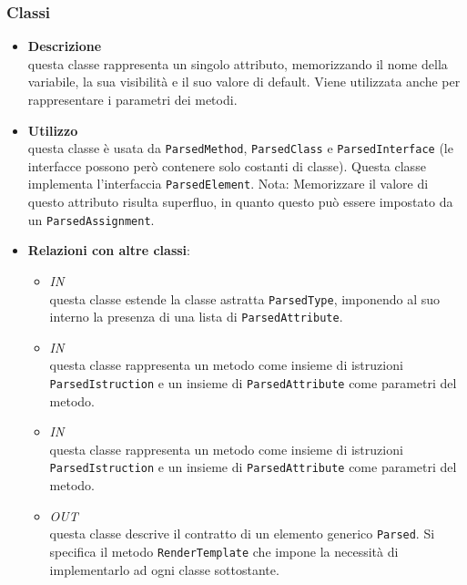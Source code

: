 \subsubsection{Classi}
\label{\nogloxy{swedesigner::server::project::ParsedAttribute}}
\begin{itemize}
\item \textbf{Descrizione}\\
questa classe rappresenta un singolo attributo, memorizzando il nome della variabile, la sua visibilità e il suo valore di default. Viene utilizzata anche per rappresentare i parametri dei metodi.
\item \textbf{Utilizzo}\\
questa classe è usata da \texttt{ParsedMethod},  \texttt{ParsedClass} e \texttt{ParsedInterface} (le interfacce possono però contenere solo costanti di classe).
Questa classe implementa l'interfaccia \texttt{ParsedElement}.
Nota: Memorizzare il valore di questo attributo risulta superfluo, in quanto questo può essere impostato da un \texttt{ParsedAssignment}. 

\item \textbf{Relazioni con altre classi}:
\begin{itemize}
\item \textit{IN} \hyperref[\nogloxy{swedesigner::server::project::ParsedClass}]{}\\
questa classe estende la classe astratta \texttt{ParsedType}, imponendo al suo interno la presenza di una lista di \texttt{ParsedAttribute}. 
\item \textit{IN} \hyperref[\nogloxy{swedesigner::server::project::ParsedMethod}]{}\\
questa classe rappresenta un metodo come insieme di istruzioni \texttt{ParsedIstruction} e un insieme di \texttt{ParsedAttribute} come parametri del metodo.
\item \textit{IN} \hyperref[\nogloxy{swedesigner::server::project::ParsedMethod}]{}\\
questa classe rappresenta un metodo come insieme di istruzioni \texttt{ParsedIstruction} e un insieme di \texttt{ParsedAttribute} come parametri del metodo.
\item \textit{OUT} \hyperref[\nogloxy{swedesigner::server::project::ParsedElement}]{}\\
questa classe descrive il contratto di un elemento generico \texttt{Parsed}. Si specifica il metodo \texttt{RenderTemplate} che impone la necessità di implementarlo ad ogni classe sottostante.
\end{itemize}
\end{itemize}

